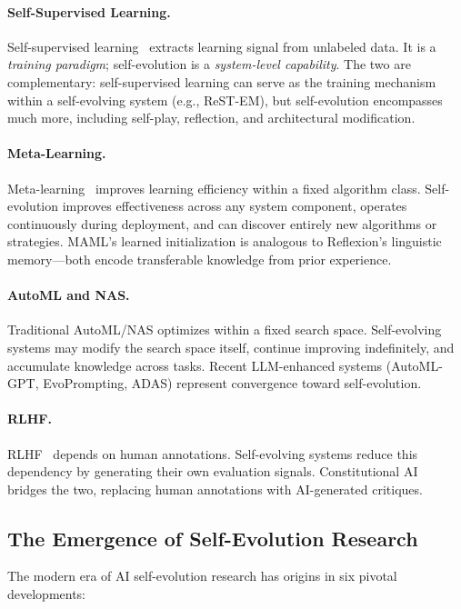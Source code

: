 \paragraph{Self-Supervised Learning.}
Self-supervised learning~\citep{liu2021selfsupervised} extracts learning signal from unlabeled data. It is a \emph{training paradigm}; self-evolution is a \emph{system-level capability}. The two are complementary: self-supervised learning can serve as the training mechanism within a self-evolving system (e.g., ReST-EM), but self-evolution encompasses much more, including self-play, reflection, and architectural modification.

\paragraph{Meta-Learning.}
Meta-learning~\citep{hospedales2021metalearning} improves learning efficiency within a fixed algorithm class. Self-evolution improves effectiveness across any system component, operates continuously during deployment, and can discover entirely new algorithms or strategies. MAML's learned initialization is analogous to Reflexion's linguistic memory---both encode transferable knowledge from prior experience.

\paragraph{AutoML and NAS.}
Traditional AutoML/NAS optimizes within a fixed search space. Self-evolving systems may modify the search space itself, continue improving indefinitely, and accumulate knowledge across tasks. Recent LLM-enhanced systems (AutoML-GPT, EvoPrompting, ADAS) represent convergence toward self-evolution.

\paragraph{RLHF.}
RLHF~\citep{ouyang2022rlhf} depends on human annotations. Self-evolving systems reduce this dependency by generating their own evaluation signals. Constitutional AI~\citep{bai2022constitutional} bridges the two, replacing human annotations with AI-generated critiques.


\subsection{The Emergence of Self-Evolution Research}
\label{sec:emergence}

The modern era of AI self-evolution research has origins in six pivotal developments:

